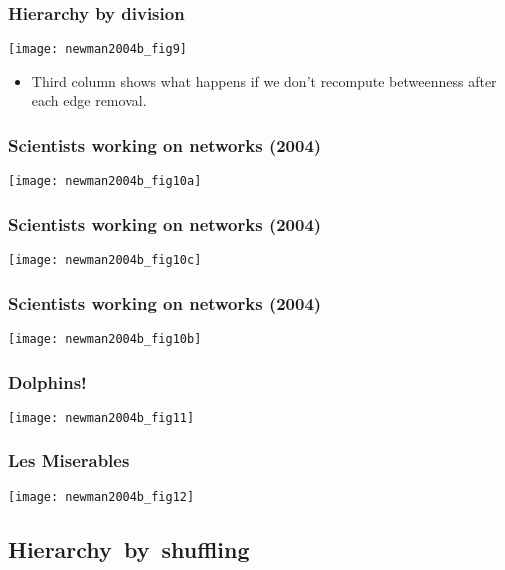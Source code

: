\begin{frame}
  \frametitle{Hierarchy by division}

  \texttt{[image: newman2004b\_fig9]}

  \begin{itemize}
  \item 
    Third column shows what happens if
    we don't recompute betweenness after
    each edge removal.
  \end{itemize}

\end{frame}


\begin{frame}
  \frametitle{Scientists working on networks (2004)}

  \texttt{[image: newman2004b\_fig10a]}

\end{frame}

\begin{frame}
  \frametitle{Scientists working on networks (2004)}

  \texttt{[image: newman2004b\_fig10c]}

\end{frame}

\begin{frame}
  \frametitle{Scientists working on networks (2004)}

  \texttt{[image: newman2004b\_fig10b]}

\end{frame}


\begin{frame}
  \frametitle{Dolphins!}

  \texttt{[image: newman2004b\_fig11]}

\end{frame}


\begin{frame}
  \frametitle{Les Miserables}

  \texttt{[image: newman2004b\_fig12]}

\end{frame}


\subsection{Hierarchy\ by\ shuffling}

